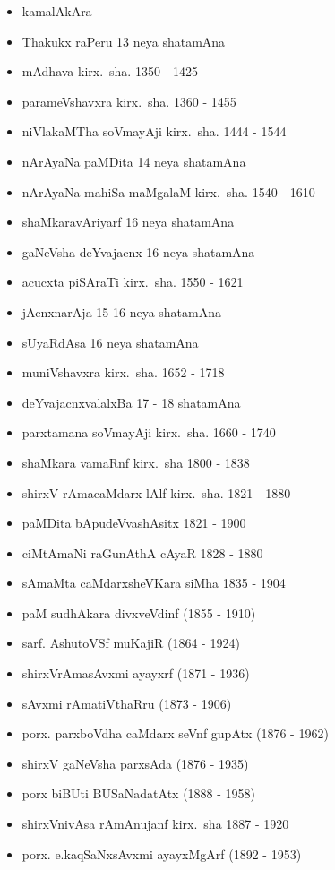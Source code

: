 {\begin{itemize}
\item kamalAkAra
\item Thakukx raPeru {\rm 13} neya shatamAna
\item mAdhava kirx.~sha. {\rm 1350 - 1425}
\item parameVshavxra kirx.~sha. {\rm 1360 - 1455}
\item niVlakaMTha soVmayAji kirx.~sha. {\rm 1444 - 1544}
\item nArAyaNa paMDita {\rm 14} neya shatamAna
\item nArAyaNa mahiSa maMgalaM kirx.~sha. {\rm 1540 - 1610}
\item shaMkaravAriyarf {\rm 16} neya shatamAna
\item gaNeVsha deYvajacnx {\rm 16} neya shatamAna
\item acucxta piSAraTi kirx.~sha. {\rm 1550 - 1621}
\item jAcnxnarAja {\rm 15-16} neya shatamAna
\item sUyaRdAsa {\rm 16} neya shatamAna
\item muniVshavxra kirx.~sha. {\rm 1652 - 1718}
\item deYvajacnxvalalxBa {\rm 17 - 18} shatamAna
\item parxtamana soVmayAji kirx.~sha. {\rm 1660 - 1740}
\item shaMkara vamaRnf kirx.~sha {\rm 1800 - 1838}
\item shirxV rAmacaMdarx lAlf kirx.~sha. {\rm 1821 - 1880}
\item paMDita bApudeVvashAsitx {\rm 1821 - 1900}
\item ciMtAmaNi raGunAthA cAyaR {\rm 1828 - 1880}
\item sAmaMta caMdarxsheVKara siMha {\rm 1835 - 1904}
\item paM sudhAkara divxveVdinf {\rm (1855 - 1910)}
\item sarf. AshutoVSf muKajiR {\rm (1864 - 1924)}
\item shirxVrAmasAvxmi ayayxrf {\rm (1871 - 1936)}
\item sAvxmi rAmatiVthaRru {\rm (1873 - 1906)}
\item porx. parxboVdha caMdarx seVnf gupAtx {\rm (1876 - 1962)}
\item shirxV gaNeVsha parxsAda {\rm (1876 - 1935)}
\item porx biBUti BUSaNadatAtx {\rm (1888 - 1958)}
\item shirxVnivAsa rAmAnujanf kirx.~sha {\rm 1887 - 1920}
\item porx. e.kaqSaNxsAvxmi ayayxMgArf {\rm (1892 - 1953)}

\end{itemize}}
